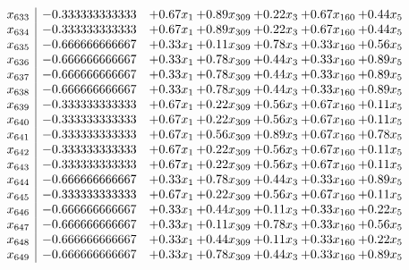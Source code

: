\documentclass[8pt]{article}
\begin{document}
\[\begin{array}{c| c c@{\hskip 2pt} c@{\hskip 2pt} c@{\hskip 2pt} c@{\hskip 2pt} c@{\hskip 2pt} }
 x_{633}   &  -0.333333333333 & +  0.67 x_{1} & +  0.89 x_{309} & +  0.22 x_{3} & +  0.67 x_{160} & +  0.44 x_{5}\\
 x_{634}   &  -0.333333333333 & +  0.67 x_{1} & +  0.89 x_{309} & +  0.22 x_{3} & +  0.67 x_{160} & +  0.44 x_{5}\\
 x_{635}   &  -0.666666666667 & +  0.33 x_{1} & +  0.11 x_{309} & +  0.78 x_{3} & +  0.33 x_{160} & +  0.56 x_{5}\\
 x_{636}   &  -0.666666666667 & +  0.33 x_{1} & +  0.78 x_{309} & +  0.44 x_{3} & +  0.33 x_{160} & +  0.89 x_{5}\\
 x_{637}   &  -0.666666666667 & +  0.33 x_{1} & +  0.78 x_{309} & +  0.44 x_{3} & +  0.33 x_{160} & +  0.89 x_{5}\\
 x_{638}   &  -0.666666666667 & +  0.33 x_{1} & +  0.78 x_{309} & +  0.44 x_{3} & +  0.33 x_{160} & +  0.89 x_{5}\\
 x_{639}   &  -0.333333333333 & +  0.67 x_{1} & +  0.22 x_{309} & +  0.56 x_{3} & +  0.67 x_{160} & +  0.11 x_{5}\\
 x_{640}   &  -0.333333333333 & +  0.67 x_{1} & +  0.22 x_{309} & +  0.56 x_{3} & +  0.67 x_{160} & +  0.11 x_{5}\\
 x_{641}   &  -0.333333333333 & +  0.67 x_{1} & +  0.56 x_{309} & +  0.89 x_{3} & +  0.67 x_{160} & +  0.78 x_{5}\\
 x_{642}   &  -0.333333333333 & +  0.67 x_{1} & +  0.22 x_{309} & +  0.56 x_{3} & +  0.67 x_{160} & +  0.11 x_{5}\\
 x_{643}   &  -0.333333333333 & +  0.67 x_{1} & +  0.22 x_{309} & +  0.56 x_{3} & +  0.67 x_{160} & +  0.11 x_{5}\\
 x_{644}   &  -0.666666666667 & +  0.33 x_{1} & +  0.78 x_{309} & +  0.44 x_{3} & +  0.33 x_{160} & +  0.89 x_{5}\\
 x_{645}   &  -0.333333333333 & +  0.67 x_{1} & +  0.22 x_{309} & +  0.56 x_{3} & +  0.67 x_{160} & +  0.11 x_{5}\\
 x_{646}   &  -0.666666666667 & +  0.33 x_{1} & +  0.44 x_{309} & +  0.11 x_{3} & +  0.33 x_{160} & +  0.22 x_{5}\\
 x_{647}   &  -0.666666666667 & +  0.33 x_{1} & +  0.11 x_{309} & +  0.78 x_{3} & +  0.33 x_{160} & +  0.56 x_{5}\\
 x_{648}   &  -0.666666666667 & +  0.33 x_{1} & +  0.44 x_{309} & +  0.11 x_{3} & +  0.33 x_{160} & +  0.22 x_{5}\\
 x_{649}   &  -0.666666666667 & +  0.33 x_{1} & +  0.78 x_{309} & +  0.44 x_{3} & +  0.33 x_{160} & +  0.89 x_{5}\\

\end{array}\]
\end{document}
